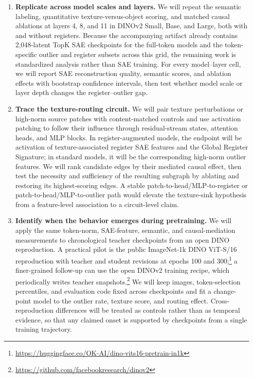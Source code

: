 \documentclass{article}
\theoremstyle{plain}
\theoremstyle{definition}
\theoremstyle{remark}
\begin{document}
\begin{enumerate}
    \item \textbf{Replicate across model scales and layers.} We will repeat the semantic labeling, quantitative texture-versus-object scoring, and matched causal ablations at layers 4, 8, and 11 in DINOv2 Small, Base, and Large, both with and without registers. Because the accompanying artifact already contains 2,048-latent TopK SAE checkpoints for the full-token models and the token-specific outlier and register subsets across this grid, the remaining work is standardized analysis rather than SAE training. For every model--layer cell, we will report SAE reconstruction quality, semantic scores, and ablation effects with bootstrap confidence intervals, then test whether model scale or layer depth changes the register--outlier gap.

    \item \textbf{Trace the texture-routing circuit.} We will pair texture perturbations or high-norm source patches with content-matched controls and use activation patching to follow their influence through residual-stream states, attention heads, and MLP blocks. In register-augmented models, the endpoint will be activation of texture-associated register SAE features and the Global Register Signature; in standard models, it will be the corresponding high-norm outlier features. We will rank candidate edges by their mediated causal effect, then test the necessity and sufficiency of the resulting subgraph by ablating and restoring its highest-scoring edges. A stable patch-to-head/MLP-to-register or patch-to-head/MLP-to-outlier path would elevate the texture-sink hypothesis from a feature-level association to a circuit-level claim.

    \item \textbf{Identify when the behavior emerges during pretraining.} We will apply the same token-norm, SAE-feature, semantic, and causal-mediation measurements to chronological teacher checkpoints from an open DINO reproduction. A practical pilot is the public ImageNet-1k DINO ViT-S/16 reproduction with teacher and student revisions at epochs 100 and 300;\footnote{\url{https://huggingface.co/OK-AI/dino-vits16-pretrain-in1k}} a finer-grained follow-up can use the open DINOv2 training recipe, which periodically writes teacher snapshots.\footnote{\url{https://github.com/facebookresearch/dinov2}} We will keep images, token-selection percentiles, and evaluation code fixed across checkpoints and fit a change-point model to the outlier rate, texture score, and routing effect. Cross-reproduction differences will be treated as controls rather than as temporal evidence, so that any claimed onset is supported by checkpoints from a single training trajectory.
\end{enumerate}




\end{document}
